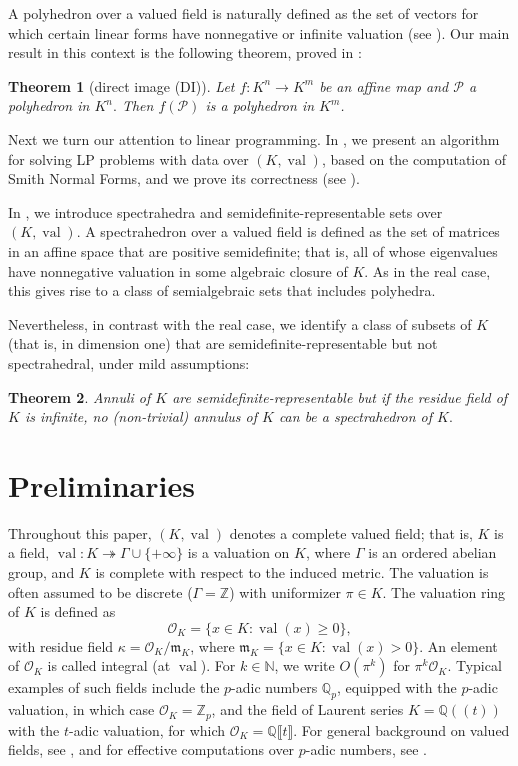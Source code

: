 \documentclass[sigconf]{acmart}
\newcommand{\N}{\mathbb{N}} %
\newcommand{\PP}{\mathcal{P}}
\newtheorem{theorem}{Theorem}[section]
\DeclareMathOperator{\val}{val}
\def\QQ{\ensuremath{\mathbb{Q}}}
\def\ZZ{\ensuremath{\mathbb{Z}}}
\newcommand{\OK}{\mathcal{O}_K}
\providecommand{\DIFaddend}{} %
\DeclareRobustCommand{\DIFaddend}{\DIFOaddend \let\includegraphics\DIFOincludegraphics} %
\begin{document}
\DIFaddend A polyhedron over a valued field is naturally defined as the set of vectors for which certain
linear forms have nonnegative or infinite valuation (see ). Our main result in this
context is the following theorem, proved in :

\begin{theorem}[direct image (DI)] \label{theo:DI}
Let $f : K^n \to K^m$ be an affine map and $\PP$ a polyhedron in $K^n.$
Then $f(\PP)$ is a polyhedron in $K^m$.
\end{theorem}

Next we turn our attention to linear programming. In , we present
an algorithm for solving LP problems with data over $(K,\val)$, based on the computation of 
Smith Normal Forms, and we prove its correctness (see ).

In , we introduce spectrahedra and semidefinite-re\-pre\-sen\-ta\-ble sets
over $(K,\val)$. A spectrahedron over a valued field is defined as the set of matrices
in an affine space that are positive semidefinite; that is, all of whose eigenvalues
have nonnegative valuation in some algebraic closure of $K$. As in the real case, this gives rise
to a class of semialgebraic sets that includes polyhedra.

Nevertheless, in contrast with the real case, we identify a class of subsets of $K$
(that is, in dimension one) that are semidefinite-representable but not spectrahedral, 
under mild assumptions:

\begin{theorem}\label{main_2}
Annuli of $K$ are semidefinite-representable but if the residue field of $K$ is infinite, no (non-trivial) annulus of $K$ can be a spectrahedron of $K.$
\end{theorem}


\section{Preliminaries}
\label{sec:prelim}

Throughout this paper, $(K,\val)$ denotes a complete valued field; that is, $K$ is a field,
$\val : K \twoheadrightarrow \Gamma \cup \{+\infty\}$ is a valuation on $K$, where $\Gamma$ 
is an ordered abelian group, and $K$ is complete with respect to the induced metric.
The valuation is often assumed to be discrete ($\Gamma=\ZZ$)
with uniformizer $\pi \in K$. The valuation ring of $K$ is defined as
$$
\OK = \{x \in K : \val(x) \geq 0\},
$$
with residue field $\kappa = \OK/\mathfrak{m}_K$, where
$\mathfrak{m}_K = \{x \in K : \val(x) > 0\}$.
An element of $\OK$ is called integral (at $\val$).
For $k \in \N$, we write $O(\pi^k)$ for $\pi^k \OK$.
Typical examples of such fields include the $p$-adic numbers 
$\QQ_p$, equipped with the $p$-adic valuation, in which case $\OK = \ZZ_p$, 
and the field of Laurent series
$K=\QQ(\!(t)\!)$ with the $t$-adic valuation,
for which $\OK = \QQ \llbracket t \rrbracket$.
For general background on valued fields, see \cite{Serre:1979,engler2005valued},
and for effective computations over $p$-adic numbers, see \cite{caruso_computations_2017}.
\end{document}
